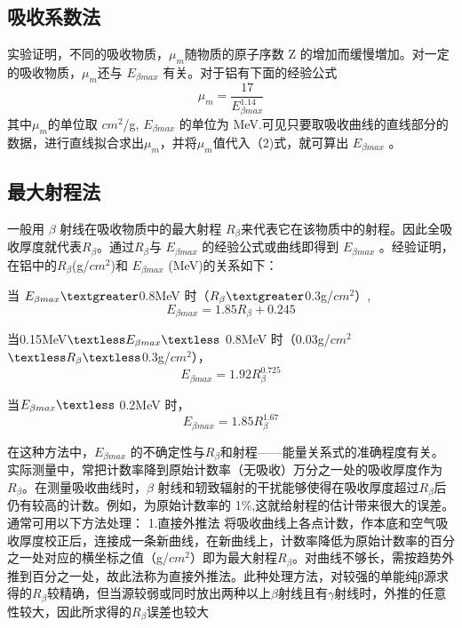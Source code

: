 \documentclass[hyperref]{ctexart}
\begin{document}
	\subsection{吸收系数法}

	实验证明，不同的吸收物质，$ \mu_m$随物质的原子序数 Z 的增加而缓慢増加。对一定的吸收物质，$ \mu_m$还与 $E_{\beta {max}}$ 有关。对于铝有下面的经验公式
	\begin{equation}
	\mu_m=\frac{17}{E^{1.14}_{\beta max}}\label{22}
	\end{equation}
其中$ \mu_m$的单位取 ${cm}^2$/g, $E_{\beta max}$ 的单位为 MeV.可见只要取吸收曲线的直线部分的数据，进行直线拟合求出$\mu_m$，并将$\mu_m$值代入（2)式，就可算出 $E_{\beta max}$ 。

	\subsection{最大射程法}

	一般用 $\beta$ 射线在吸收物质中的最大射程 $R_\beta$来代表它在该物质中的射程。因此全吸收厚度就代表$R_\beta$。通过$R_\beta$与 $E_{\beta max}$ 的经验公式或曲线即得到 $E_{\beta max}$ 。经验证明，在铝中的$R_\beta$(g/${cm}^2$)和 $E_{\beta max}$ (MeV)的关系如下：

	当 $E_{\beta max} \textgreater$0.8MeV 时（$R_\beta\textgreater$0.3g/${cm}^2$）,
	\begin{equation}
	E_{\beta max}=1.85 R_{\beta}+0.245
	\end{equation}

	当0.15MeV$\textless E_{\beta max}\textless$ 0.8MeV 时（0.03g/${cm}^2$$\textless R_\beta\textless$0.3g/${cm}^2$），
	\begin{equation}
	E_{\beta max}=1.92 R_{\beta}^{0.725}\label{3b}
	\end{equation}

	当$E_{\beta max}\textless$ 0.2MeV 时，
	\begin{equation}
	E_{\beta max}=1.85 R_{\beta}^{1.67}
	\end{equation}


	在这种方法中，$E_{\beta max}$ 的不确定性与$R_\beta$和射程——能量关系式的准确程度有关。实际测量中，常把计数率降到原始计数率（无吸收）万分之一处的吸收厚度作为
$R_\beta$。在测量吸收曲线时，$\beta$ 射线和轫致辐射的干扰能够使得在吸收厚度超过$R_\beta$后仍有较高的计数。例如，为原始计数率的 1\%,这就给射程的估计带来很大的误差。通常可用以下方法处理：
	1.直接外推法
将吸收曲线上各点计数，作本底和空气吸收厚度校正后，连接成一条新曲线，在新曲线上，计数率降低为原始计数率的百分之一处对应的横坐标之值（g/${cm}^2$）即为最大射程$R_\beta$。对曲线不够长，需按趋势外推到百分之一处，故此法称为直接外推法。此种处理方法，对较强的单能纯β源求得的$R_\beta$较精确，但当源较弱或同时放出两种以上$\beta$射线且有$\gamma$射线时，外推的任意性较大，因此所求得的$R_\beta$误差也较大
\end{document}
